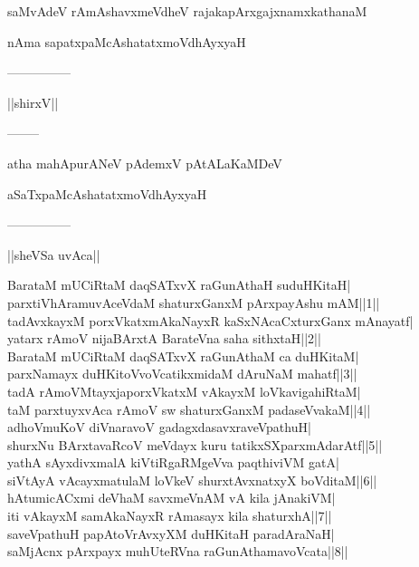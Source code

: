 \documentclass{article}
\begin{document}
\begin{center}
saMvAdeV rAmAshavxmeVdheV rajakapArxgajxnamxkathanaM
\end{center}

\begin{center}
nAma sapatxpaMcAshatatxmoVdhAyxyaH
\end{center}

\begin{center}
---------------
\end{center}

\begin{center}
||shirxV||
\end{center}

\begin{center}
--------
\end{center}

\begin{center}
atha mahApurANeV pAdemxV pAtALaKaMDeV
\end{center}

\begin{center}
aSaTxpaMcAshatatxmoVdhAyxyaH
\end{center}

\begin{center}
---------------
\end{center}

\begin{center}
||sheVSa uvAca||
\end{center}

BarataM mUCiRtaM daqSATxvX raGunAthaH suduHKitaH|\\
parxtiVhAramuvAceVdaM shaturxGanxM pArxpayAshu mAM||1||\\
tadAvxkayxM porxVkatxmAkaNayxR kaSxNAcaCxturxGanx mAnayatf|\\
yatarx rAmoV nijaBArxtA BarateVna saha sithxtaH||2||\\
BarataM mUCiRtaM daqSATxvX raGunAthaM ca duHKitaM|\\
parxNamayx duHKitoVvoVcatikxmidaM dAruNaM mahatf||3||\\
tadA rAmoVMtayxjaporxVkatxM vAkayxM loVkavigahiRtaM|\\
taM parxtuyxvAca rAmoV sw shaturxGanxM padaseVvakaM||4||\\
adhoVmuKoV diVnaravoV gadagxdasavxraveVpathuH|\\
shurxNu BArxtavaRcoV meVdayx kuru tatikxSXparxmAdarAtf||5||\\
yathA sAyxdivxmalA kiVtiRgaRMgeVva paqthiviVM gatA|\\
siVtAyA vAcayxmatulaM loVkeV shurxtAvxnatxyX boVditaM||6||\\
hAtumicACxmi deVhaM savxmeVnAM vA kila jAnakiVM|\\
iti vAkayxM samAkaNayxR rAmasayx kila shaturxhA||7||\\
saveVpathuH papAtoVrAvxyXM duHKitaH paradAraNaH|\\
saMjAcnx pArxpayx muhUteRVna raGunAthamavoVcata||8||\\
\end{document}
